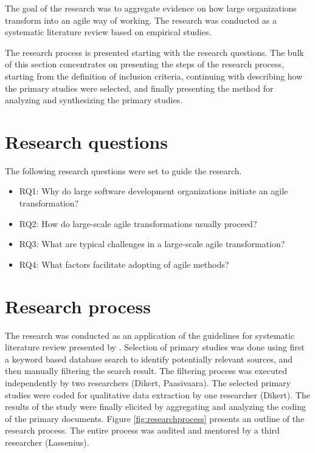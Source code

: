 The goal of the research was to aggregate evidence on how large organizations
transform into an agile way of working. The research was conducted as a
systematic literature review based on empirical studies.

The research process is presented starting with the research questions.
The bulk of this section concentrates on presenting the steps of the research
process, starting from the definition of inclusion criteria, continuing with
describing how the primary studies were selected, and finally presenting the
method for analyzing and synthesizing the primary studies.


\section{Research questions}

The following research questions were set to guide the research.

\begin{itemize}

\item
RQ1: Why do large software development organizations initiate an agile
transformation?

\item
RQ2: How do large-scale agile transformations usually proceed?

\item
RQ3: What are typical challenges in a large-scale agile transformation?

\item
RQ4: What factors facilitate adopting of agile methods?

\end{itemize}


\section{Research process}

The research was conducted as an application of the guidelines for systematic
literature review presented by \citet{Kitchenham2007}. Selection of primary
studies was done using first a keyword based database search to identify
potentially relevant sources, and then manually filtering the search result. The
filtering process was executed independently by two researchers (Dikert,
Paasivaara). The selected primary studies were coded for qualitative data
extraction by one researcher (Dikert). The results of the study were finally
elicited by aggregating and analyzing the coding of the primary documents.
Figure \ref{fig:researchprocess} presents an outline of the research process.
The entire process was audited and mentored by a third researcher (Lassenius).

